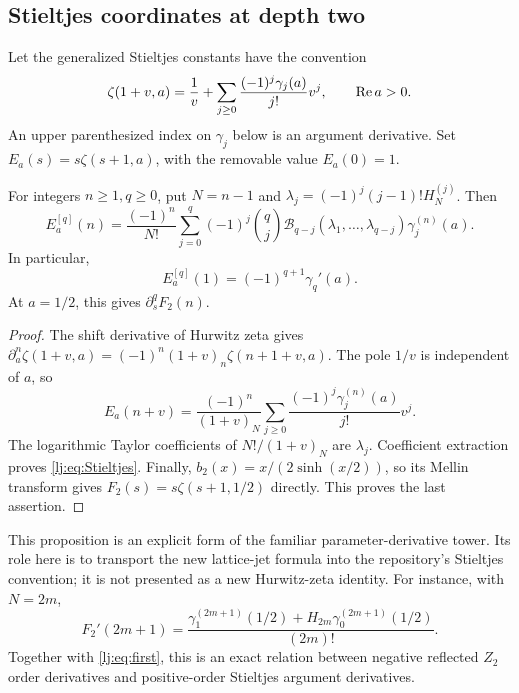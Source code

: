 \subsection{Stieltjes coordinates at depth two}

Let the generalized Stieltjes constants have the convention
\[
 \zeta(1+v,a)=\frac1v+
       \sum_{j\geq0}\frac{(-1)^j\gamma_j(a)}{j!}v^j,
       \qquad \operatorname{Re} a>0.
\]
An upper parenthesized index on $\gamma_j$ below is an argument
derivative. Set $E_a(s)=s\zeta(s+1,a)$, with the removable value
$E_a(0)=1$.

\begin{proposition}
\label{lj:prop:Stieltjes}
For integers $n\geq1,q\geq0$, put $N=n-1$ and
$\lambda_j=(-1)^j(j-1)!H_N^{(j)}$. Then
\begin{equation}
 \boxed{\displaystyle
 E_a^{[q]}(n)=\frac{(-1)^n}{N!}
   \sum_{j=0}^q(-1)^j\binom qj
       \mathcal B_{q-j}(\lambda_1,\ldots,\lambda_{q-j})
       \gamma_j^{(n)}(a).}
 \label{lj:eq:Stieltjes}
\end{equation}
In particular,
\begin{equation}
 E_a^{[q]}(1)=(-1)^{q+1}\gamma_q'(a).
 \label{lj:eq:Stieltjesone}
\end{equation}
At $a=1/2$, this gives $\partial_s^qF_2(n)$.
\end{proposition}

\begin{proof}
The shift derivative of Hurwitz zeta gives
$\partial_a^n\zeta(1+v,a)=(-1)^n(1+v)_n\zeta(n+1+v,a)$.
The pole $1/v$ is independent of $a$, so
\begin{equation}
 E_a(n+v)=\frac{(-1)^n}{(1+v)_N}
       \sum_{j\geq0}\frac{(-1)^j\gamma_j^{(n)}(a)}{j!}v^j.
 \label{lj:eq:Stieltjesgerm}
\end{equation}
The logarithmic Taylor coefficients of $N!/(1+v)_N$ are $\lambda_j$.
Coefficient extraction proves \eqref{lj:eq:Stieltjes}.
Finally, $b_2(x)=x/(2\sinh(x/2))$, so its Mellin transform gives
$F_2(s)=s\zeta(s+1,1/2)$ directly. This proves the last assertion.
\end{proof}

This proposition is an explicit form of the familiar parameter-derivative
tower. Its role here is to transport the new lattice-jet formula into
the repository's Stieltjes convention; it is not presented as a new
Hurwitz-zeta identity. For instance, with $N=2m$,
\[
 F_2'(2m+1)=\frac{
       \gamma_1^{(2m+1)}(1/2)
        +H_{2m}\gamma_0^{(2m+1)}(1/2)}{(2m)!}.
\]
Together with \eqref{lj:eq:first}, this is an exact relation between
negative reflected $Z_2$ order derivatives and positive-order Stieltjes
argument derivatives.

